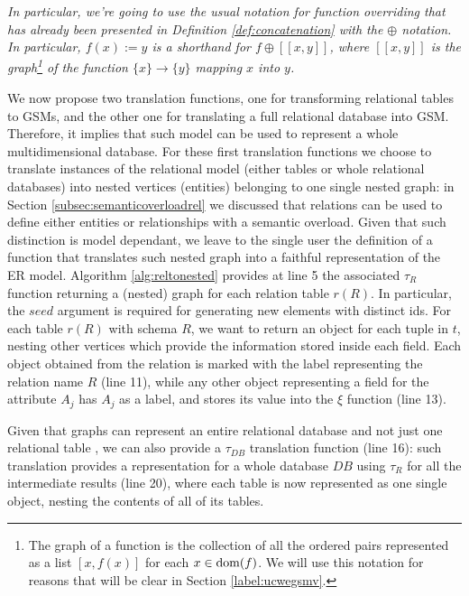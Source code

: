 \textit{In particular, we're going to use the usual notation for function overriding \cite{Nielson05} that has already been presented in Definition \vref{def:concatenation} with the $\oplus$ notation. In particular, $f(x):=y$ is a shorthand for $f\oplus [[x, y]]$, where $[[x, y]]$ is the  graph\footnote{The graph of a function is the collection of all the ordered pairs represented as a list $[x,f(x)]$ for each $x\in\operatorname{dom}(f)$. We will use this notation for reasons that will be clear in Section \vref{label:ucwegsmv}.} of the function $\{x\}\to \{y\}$ mapping $x$ into $y$.}



We now propose two translation functions, one for transforming relational tables to GSMs, and the other one for translating a full relational database into GSM. Therefore, it implies that such model can be used to represent a whole multidimensional database. For these first translation functions we choose to translate instances of the relational model (either tables or whole relational databases) into nested vertices (entities) belonging to one single nested graph: in Section \vref{subsec:semanticoverloadrel} we discussed that relations can be used to define either entities or relationships with a semantic overload. Given that such distinction is model dependant, we leave to the single user the definition of a function that translates such nested graph into a faithful representation of the ER model. Algorithm \vref{alg:reltonested} provides at line 5 the associated $\tau_R$ function returning a (nested) graph for each relation table $r(R)$. In particular, the $seed$ argument is required for generating new elements with distinct ids. 
For each table $r(R)$ with schema $R$, we want to return an object for each tuple in $t$, nesting other vertices which provide the information stored inside each field. Each object obtained from the relation is marked with the  label representing  the relation name $R$ (line 11), while any other object representing a field for the attribute $A_j$ has $A_j$ as a label, and stores its value into the $\xi$ function (line 13).  

Given that graphs can represent an entire relational database and
not just one relational table \cite{Fagin83,bergami2014}, we can also provide a $\tau_{DB}$ translation function (line 16): such translation provides a representation for a whole database $DB$ using $\tau_R$ for all the intermediate results (line 20), where each table is now represented as one single object, nesting the contents of all of its tables.


